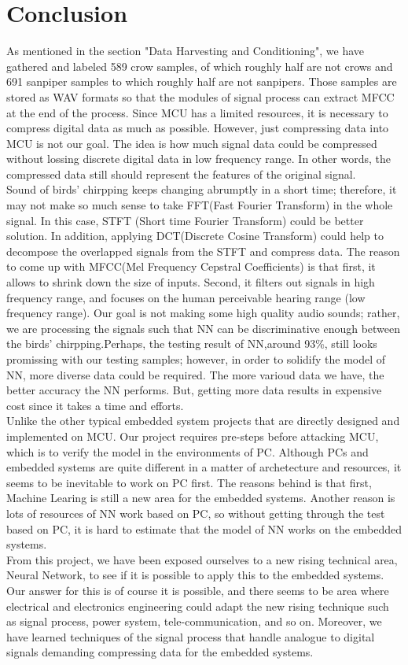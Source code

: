 \documentclass{article}
\begin{document}
\section{Conclusion}
As mentioned in the section "Data Harvesting and Conditioning",
we have gathered and labeled 589 crow samples, of which roughly half are not crows and 691 sanpiper samples to which roughly half are not sanpipers. Those samples are stored as WAV formats so that the modules of signal process can extract MFCC at the end of the process. Since MCU has a limited resources, it is necessary to compress digital data as much as possible. However, just compressing data into MCU is not our goal. The idea is how much signal data could be compressed without lossing discrete digital data in low frequency range. In other words, the compressed data still should represent the features of the original signal.\\
Sound of birds' chirpping keeps changing abrumptly in a short time; therefore, it may not make so much sense to take FFT(Fast Fourier Transform) in the whole signal. In this case, STFT (Short time Fourier Transform) could be better solution. In addition, applying DCT(Discrete Cosine Transform) could help to decompose the overlapped signals from the STFT and compress data. The reason to come up with MFCC(Mel Frequency Cepstral Coefficients) is that first, it allows to shrink down the size of inputs. Second, it filters out signals in high frequency range, and focuses on the human perceivable hearing range (low frequency range). Our goal is not making some high quality audio sounds; rather, we are processing the signals such that NN can be discriminative enough between the birds' chirpping.Perhaps, the testing result of NN,around 93\%, still looks promissing with our testing samples; however, in order to solidify the model of NN, more diverse data could be required. The more varioud data we have, the better accuracy the NN performs. But, getting more data results in expensive cost since it takes a time and efforts.\\
Unlike the other typical embedded system projects that are directly designed and implemented on MCU. Our project requires pre-steps before attacking MCU, which is to verify the model in the environments of PC. Although PCs and embedded systems are quite different in a matter of archetecture and resources, it seems to be inevitable to work on PC first. The reasons behind is that first, Machine Learing is still a new area for the embedded systems. Another reason is lots of resources of NN work based on PC, so without getting through the test based on PC, it is hard to estimate that the model of NN works on the embedded systems.\\
From this project, we have been exposed ourselves to a new rising technical area, Neural Network, to see if it is possible to apply this to the embedded systems. Our answer for this is of course it is possible, and there seems to be area where electrical and electronics engineering could adapt the new rising technique such as signal process, power system, tele-communication, and so on. Moreover, we have learned techniques of the signal process that handle analogue to digital signals demanding compressing data for the embedded systems. 
\newpage
\end{document}
